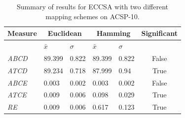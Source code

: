 \begin{table}[htp]
	\centering\small
		\begin{tabular}{lllllc}
		\toprule
		\textbf{Measure} & \multicolumn{2}{c}{\textbf{Euclidean}} & \multicolumn{2}{c}{\textbf{Hamming}} & \textbf{Significant} \\ 
		\midrule
		 & $\bar{x}$ & $\sigma$ & $\bar{x}$ & $\sigma$ &  \\ 
		\toprule
		\emph{ABCD} & 89.399 & 0.822 & 89.399 & 0.822 & False \\ 
		\emph{ATCD} & 89.234 & 0.718 & 87.999 & 0.94 & True \\ 
		\emph{ABCE} & 0.003 & 0.002 & 0.003 & 0.002 & False \\ 
		\emph{ATCE} & 0.009 & 0.006 & 0.098 & 0.029 & True \\ 
		\emph{RE} & 0.009 & 0.006 & 0.617 & 0.123 & True \\ 
		\bottomrule
		\end{tabular}
	\caption{Summary of results for ECCSA with two different mapping schemes on ACSP-10.}
	\label{tab:cells:mccsa:mappings}
\end{table}


